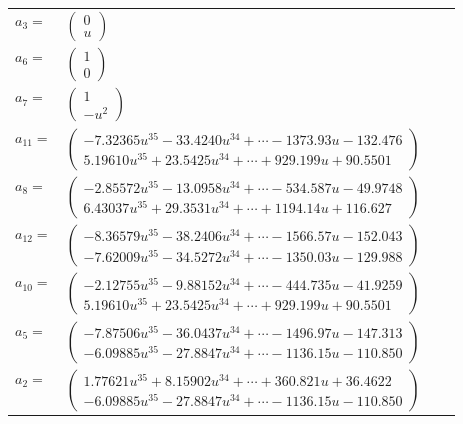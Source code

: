 \documentclass[1p]{elsarticle_modified}
\theoremstyle{definition}
\begin{document}
\begin{tabular}{m{7pt} m{180pt} m{7pt} m{180pt} }
\flushright $a_{3}=$&$\begin{pmatrix}0\\u\end{pmatrix}$ \\
\flushright $a_{6}=$&$\begin{pmatrix}1\\0\end{pmatrix}$ \\
\flushright $a_{7}=$&$\begin{pmatrix}1\\- u^2\end{pmatrix}$ \\
\flushright $a_{11}=$&$\begin{pmatrix}-7.32365 u^{35}-33.4240 u^{34}+\cdots-1373.93 u-132.476\\5.19610 u^{35}+23.5425 u^{34}+\cdots+929.199 u+90.5501\end{pmatrix}$ \\
\flushright $a_{8}=$&$\begin{pmatrix}-2.85572 u^{35}-13.0958 u^{34}+\cdots-534.587 u-49.9748\\6.43037 u^{35}+29.3531 u^{34}+\cdots+1194.14 u+116.627\end{pmatrix}$ \\
\flushright $a_{12}=$&$\begin{pmatrix}-8.36579 u^{35}-38.2406 u^{34}+\cdots-1566.57 u-152.043\\-7.62009 u^{35}-34.5272 u^{34}+\cdots-1350.03 u-129.988\end{pmatrix}$ \\
\flushright $a_{10}=$&$\begin{pmatrix}-2.12755 u^{35}-9.88152 u^{34}+\cdots-444.735 u-41.9259\\5.19610 u^{35}+23.5425 u^{34}+\cdots+929.199 u+90.5501\end{pmatrix}$ \\
\flushright $a_{5}=$&$\begin{pmatrix}-7.87506 u^{35}-36.0437 u^{34}+\cdots-1496.97 u-147.313\\-6.09885 u^{35}-27.8847 u^{34}+\cdots-1136.15 u-110.850\end{pmatrix}$ \\
\flushright $a_{2}=$&$\begin{pmatrix}1.77621 u^{35}+8.15902 u^{34}+\cdots+360.821 u+36.4622\\-6.09885 u^{35}-27.8847 u^{34}+\cdots-1136.15 u-110.850\end{pmatrix}$ \\

\end{tabular}
\end{document}
